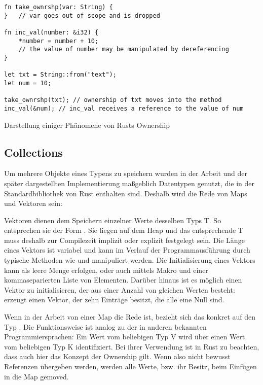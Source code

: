 \begin{listing}[th]
\begin{verbatim}
fn take_ownrshp(var: String) {
}   // var goes out of scope and is dropped

fn inc_val(number: &i32) {
    *number = number + 10;
    // the value of number may be manipulated by dereferencing
}

let txt = String::from("text");
let num = 10;

take_ownrshp(txt); // ownership of txt moves into the method
inc_val(&num); // inc_val receives a reference to the value of num
\end{verbatim}
\label{lst:ownership}
\caption{Darstellung einiger Phänomene von Rusts Ownership}
\end{listing}

\subsection{Collections}

Um mehrere Objekte eines Typens zu speichern wurden in der Arbeit und der später dargestellten Implementierung maßgeblich Datentypen genutzt, die in der Standardbibliothek von Rust enthalten sind. Deshalb wird die Rede von Maps und Vektoren sein:

Vektoren dienen dem Speichern einzelner Werte desselben Typs T. So entsprechen sie der Form . Sie liegen auf dem Heap und das entsprechende T muss deshalb zur Compilezeit implizit oder explizit festgelegt sein. Die Länge eines Vektors ist variabel und kann im Verlauf der Programmausführung durch typische Methoden wie  und  manipuliert werden. Die Initialisierung eines Vektors kann als leere Menge erfolgen, oder auch mittels Makro  und einer kommaseparierten Liste von Elementen. Darüber hinaus ist es möglich einen Vektor zu initialisieren, der aus einer Anzahl von gleichen Werten besteht:  erzeugt einen Vektor, der zehn Einträge besitzt, die alle eine Null sind.

Wenn in der Arbeit von einer Map die Rede ist, bezieht sich das konkret auf den Typ . Die Funktionsweise ist analog zu der in anderen bekannten Programmiersprachen: Ein Wert vom beliebigen Typ V wird über einen Wert vom beliebigen Typ K identifiziert. Bei ihrer Verwendung ist in Rust zu beachten, dass auch hier das Konzept der Ownership gilt. Wenn also nicht bewusst Referenzen übergeben werden, werden alle Werte, bzw. ihr Besitz, beim Einfügen in die Map gemoved. 


